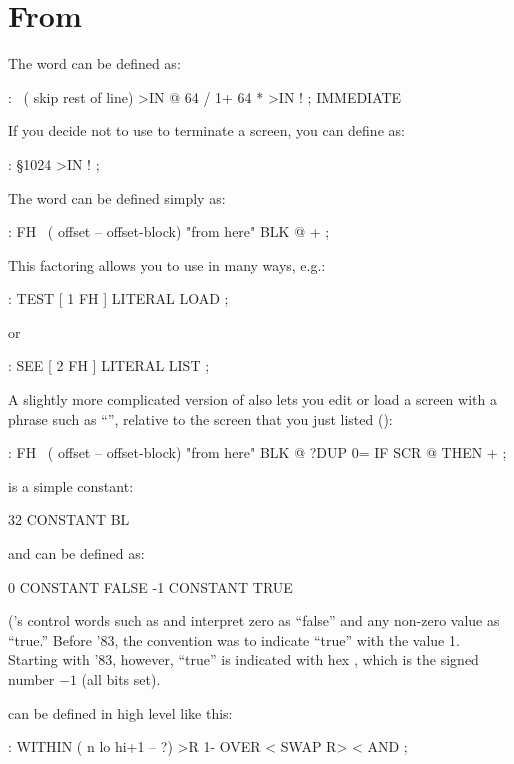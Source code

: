 \section{From }
The word \forthb{\bs} can be defined as:
\begin{Code}
: \  ( skip rest of line)
     >IN @  64 / 1+  64 *  >IN ! ; IMMEDIATE
\end{Code}
If you decide not to use  to terminate a screen, you can define 
as:
\begin{Code}
: \S   1024 >IN ! ;
\end{Code}
The word  can be defined simply as:
\begin{Code}
: FH   \   ( offset -- offset-block)   "from here"
    BLK @ + ;
\end{Code}
This factoring allows you to use  in many ways, e.g.:
\begin{Code}
: TEST   [ 1 FH ] LITERAL LOAD ;
\end{Code}
or
\begin{Code}
: SEE   [ 2 FH ] LITERAL LIST ;
\end{Code}
A slightly more complicated version of  also lets you edit or load a 
screen with a phrase such as ``'', relative to the screen that 
you just listed ():
\begin{Code}
: FH   \   ( offset -- offset-block)   "from here"
     BLK @  ?DUP 0= IF  SCR @  THEN  + ;
\end{Code}
 is a simple constant:
\begin{Code}
32 CONSTANT BL
\end{Code}
 and  can be defined as:
\begin{Code}
0 CONSTANT FALSE
-1 CONSTANT TRUE
\end{Code}
(\Forth{}'s control words such as  and  interpret zero as ``false'' 
and any non-zero value as ``true.''  Before \Forth{} '83, the convention
was to indicate ``true'' with the value 1.  Starting with \Forth{} '83,
however, ``true'' is indicated with hex , which is the signed number $-1$
(all bits set).

 can be defined in high level like this:
\begin{Code}
: WITHIN  ( n lo hi+1 -- ?)
     >R  1- OVER <  SWAP R>  < AND ;
\end{Code}

